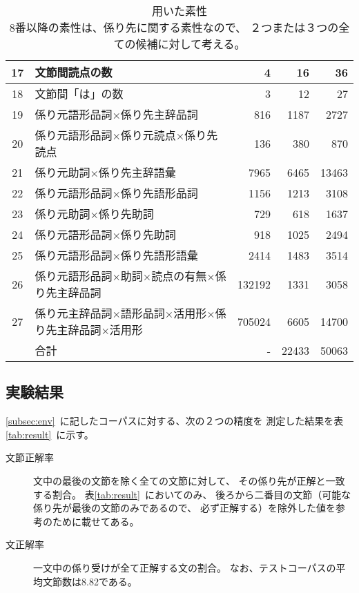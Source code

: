 \begin{table}
\begin{center}
\begin{tabular}{|c|l|r|r|r|}
	17 & 文節間読点の数 & 4 & 16 & 36 \\ \hline
	18 & 文節間「は」の数 & 3 & 12 & 27 \\ \hline \hline
	19 & 係り元語形品詞×係り先主辞品詞 & 816 & 1187 & 2727 \\ \hline 
	20 & 係り元語形品詞×係り元読点×係り先読点 & 136 & 380 & 870 \\ \hline 
	21 & 係り元助詞×係り先主辞語彙 & 7965 & 6465 & 13463 \\ \hline
	22 & 係り元語形品詞×係り先語形品詞 & 1156 & 1213 & 3108 \\ \hline
	23 & 係り元助詞×係り先助詞 & 729 & 618 & 1637 \\ \hline
	24 & 係り元語形品詞×係り先助詞 & 918 & 1025 & 2494 \\ \hline
	25 & 係り元語形品詞×係り先語形語彙 & 2414 & 1483 & 3514 \\ \hline
	26 & 係り元語形品詞×助詞×読点の有無×係り先主辞品詞 & 132192 & 1331 & 3058 \\ \hline
	27 & 係り元主辞品詞×語形品詞×活用形×係り先主辞品詞×活用形 & 705024 & 6605 & 14700 \\ \hline
	\hline & 合計 & - & 22433 & 50063 \\ \hline
	\end{tabular}
	\caption{用いた素性 \\
	{\footnotesize 8番以降の素性は、係り先に関する素性なので、
	２つまたは３つの全ての候補に対して考える。}} \label{tab:features}
	\end{center}
\end{table}

\subsection{実験結果}\label{subsec:result}

\ref{subsec:env}~に記したコーパスに対する、次の２つの精度を
測定した結果を表\ref{tab:result}~に示す。

\begin{description}
\item[文節正解率] 
	文中の最後の文節を除く全ての文節に対して、
	その係り先が正解と一致する割合。
	表\ref{tab:result}~においてのみ、
	後ろから二番目の文節（可能な係り先が最後の文節のみであるので、
	必ず正解する）を除外した値を参考のために載せてある。
\item[文正解率]
	一文中の係り受けが全て正解する文の割合。
	なお、テストコーパスの平均文節数は8.82である。
\end{description}

